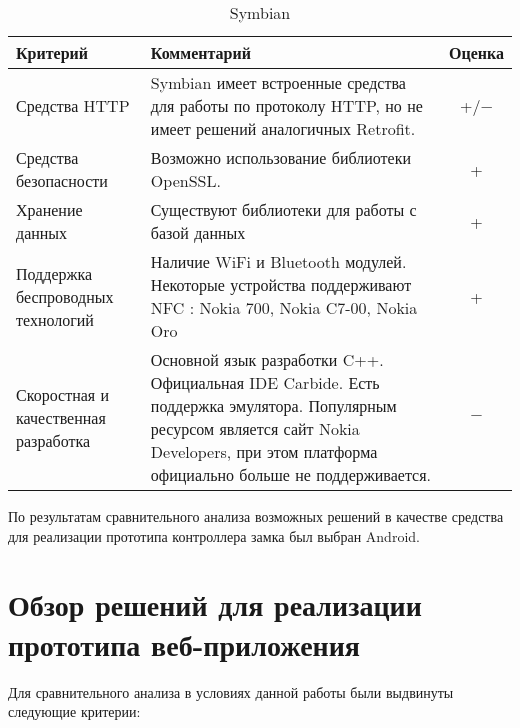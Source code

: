 \bgroup %
\def\arraystretch{1.5}%
  \begin{longtable}{| p{} | p{} | c |} 
  \caption{Symbian} %
  \hline
    Критерий & Комментарий & Оценка \\
  \hline
    Средства HTTP

    & Symbian имеет встроенные средства для работы по протоколу HTTP, но не имеет решений аналогичных Retrofit.
    & +/$-$\\
  \hline
    Средства безопасности

    & Возможно использование библиотеки OpenSSL.
    
    & + \\
  \hline
    Хранение данных

    & Существуют библиотеки для работы с базой данных 

    & + \\
  \hline
    Поддержка беспроводных технологий 
    
    & Наличие WiFi и Bluetooth модулей. Некоторые устройства поддерживают NFC : Nokia 700, Nokia C7-00, Nokia Oro

    & + \\
  \hline
    Скоростная и качественная разработка
    
    & Основной язык разработки C++. Официальная IDE Carbide. Есть поддержка эмулятора. Популярным ресурсом является сайт Nokia Developers, при этом платформа официально больше не поддерживается.

    & $-$ \\
  \hline

  \end{longtable}
\egroup %

По результатам сравнительного анализа возможных решений в качестве средства для реализации прототипа контроллера замка был выбран Android.

\pagebreak

\section{Обзор решений для реализации прототипа веб-приложения} \label{sect3_4}

Для сравнительного анализа в условиях данной работы были выдвинуты следующие критерии:

